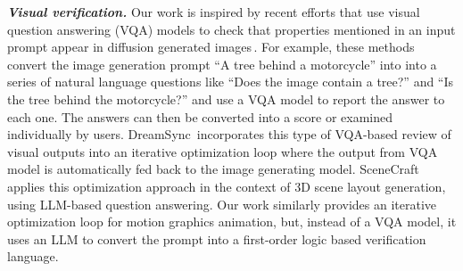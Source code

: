 \vspace{0.5em}
\noindent
{\bf \em Visual verification.}
%
%
Our work is inspired by recent efforts that use visual question
answering (VQA) models to check that properties mentioned in an input
prompt appear in diffusion generated
images\,\cite{Johnson_2017_ICCV,hu2023tifa,JaeminCho2024}.
%
For example, these methods convert the image generation prompt ``A
tree behind a motorcycle'' into into a series of natural language
questions like ``Does the image contain a tree?'' and ``Is the tree behind
the motorcycle?'' and use a VQA model to report the answer to each
one.
%
The answers can then be converted into a score or examined
individually by users.
%
%
%
%
DreamSync\,\cite{sun2024dreamsync} incorporates this type of VQA-based
review of visual outputs into an iterative optimization loop where the output from
VQA model is automatically fed back to the image generating model.
%
SceneCraft\,\cite{hu2025scenecraft} applies this optimization approach
in the context of 3D scene layout generation, using LLM-based question
answering.
%
%
Our work similarly provides an iterative optimization loop for motion
graphics animation, but, instead of a VQA model, it uses an LLM to convert the prompt into a first-order
logic based verification language.

%
%
%


